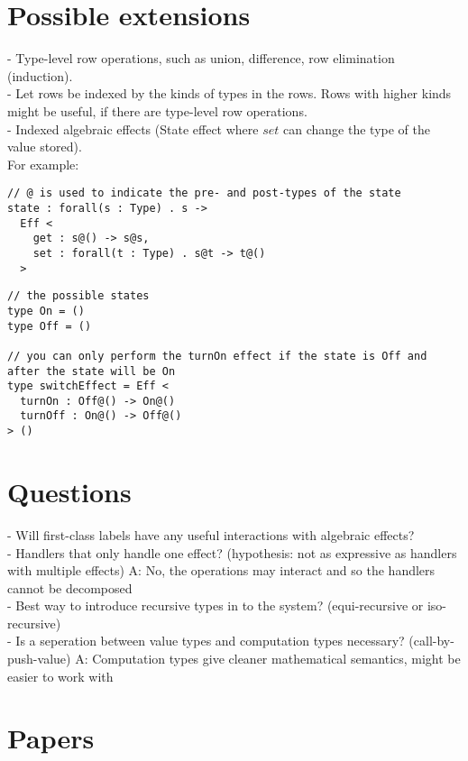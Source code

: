 \documentclass[12pt]{article}
\begin{document}
\section{Possible extensions}
- Type-level row operations, such as union, difference, row elimination (induction).\\
- Let rows be indexed by the kinds of types in the rows. Rows with higher kinds might be useful, if there are type-level row operations. \\
- Indexed algebraic effects (State effect where $set$ can change the type of the value stored).\\
For example:
\begin{lstlisting}[caption=State effect that can change state type]
// @ is used to indicate the pre- and post-types of the state
state : forall(s : Type) . s ->
  Eff <
    get : s@() -> s@s,
    set : forall(t : Type) . s@t -> t@()
  >
\end{lstlisting}
\begin{lstlisting}[caption=Typesafe state machine]
// the possible states
type On = ()
type Off = ()

// you can only perform the turnOn effect if the state is Off and after the state will be On
type switchEffect = Eff <
  turnOn : Off@() -> On@()
  turnOff : On@() -> Off@()
> ()
\end{lstlisting}

\section{Questions}
- Will first-class labels have any useful interactions with algebraic effects? \\
- Handlers that only handle one effect? (hypothesis: not as expressive as handlers with multiple effects) A: No, the operations may interact and so the handlers cannot be decomposed \\
- Best way to introduce recursive types in to the system? (equi-recursive or iso-recursive) \\
- Is a seperation between value types and computation types necessary? (call-by-push-value) A: Computation types give cleaner mathematical semantics, might be easier to work with \\

\section{Papers}
\end{document}
